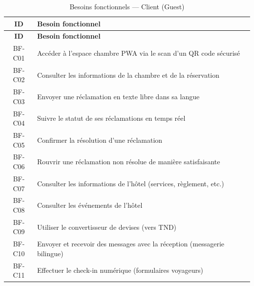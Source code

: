 
\begin{longtable}{|c|p{12cm}|}
\caption{Besoins fonctionnels — Client (Guest)} \label{tab:bf_client} \\
\hline
\textbf{ID} & \textbf{Besoin fonctionnel} \\
\hline
\endfirsthead
\hline
\textbf{ID} & \textbf{Besoin fonctionnel} \\
\hline
\endhead
BF-C01 & Accéder à l'espace chambre PWA via le scan d'un QR code sécurisé \\
\hline
BF-C02 & Consulter les informations de la chambre et de la réservation \\
\hline
BF-C03 & Envoyer une réclamation en texte libre dans sa langue \\
\hline
BF-C04 & Suivre le statut de ses réclamations en temps réel \\
\hline
BF-C05 & Confirmer la résolution d'une réclamation \\
\hline
BF-C06 & Rouvrir une réclamation non résolue de manière satisfaisante \\
\hline
BF-C07 & Consulter les informations de l'hôtel (services, règlement, etc.) \\
\hline
BF-C08 & Consulter les événements de l'hôtel \\
\hline
BF-C09 & Utiliser le convertisseur de devises (vers TND) \\
\hline
BF-C10 & Envoyer et recevoir des messages avec la réception (messagerie bilingue) \\
\hline
BF-C11 & Effectuer le check-in numérique (formulaires voyageurs) \\
\hline
\end{longtable}

